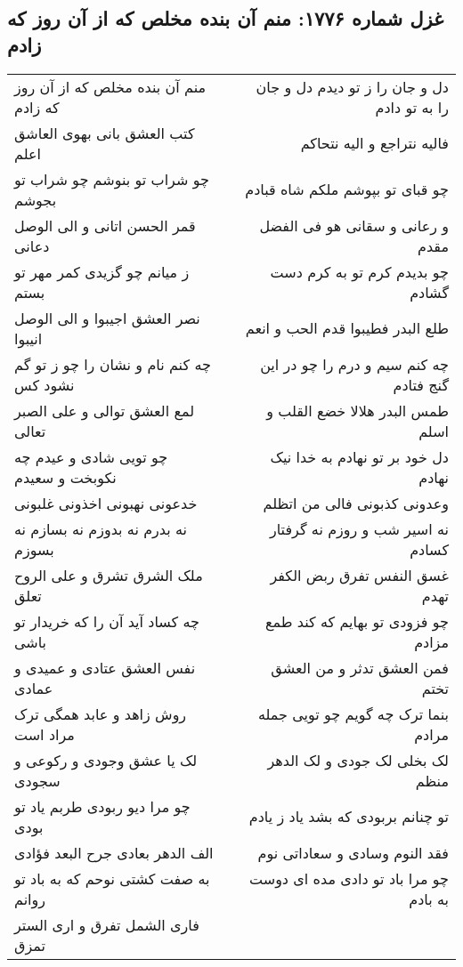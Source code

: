 \begin{center}
\section*{غزل شماره ۱۷۷۶: منم آن بنده مخلص که از آن روز که زادم}
\label{sec:1776}
\begin{longtable}{l p{0.5cm} r}
منم آن بنده مخلص که از آن روز که زادم
&&
دل و جان را ز تو دیدم دل و جان را به تو دادم
\\
کتب العشق بانی بهوی العاشق اعلم
&&
فالیه نتراجع و الیه نتحاکم
\\
چو شراب تو بنوشم چو شراب تو بجوشم
&&
چو قبای تو بپوشم ملکم شاه قبادم
\\
قمر الحسن اتانی و الی الوصل دعانی
&&
و رعانی و سقانی هو فی الفضل مقدم
\\
ز میانم چو گزیدی کمر مهر تو بستم
&&
چو بدیدم کرم تو به کرم دست گشادم
\\
نصر العشق اجیبوا و الی الوصل انیبوا
&&
طلع البدر فطیبوا قدم الحب و انعم
\\
چه کنم نام و نشان را چو ز تو گم نشود کس
&&
چه کنم سیم و درم را چو در این گنج فتادم
\\
لمع العشق توالی و علی الصبر تعالی
&&
طمس البدر هلالا خضع القلب و اسلم
\\
چو تویی شادی و عیدم چه نکوبخت و سعیدم
&&
دل خود بر تو نهادم به خدا نیک نهادم
\\
خدعونی نهبونی اخذونی غلبونی
&&
وعدونی کذبونی فالی من اتظلم
\\
نه بدرم نه بدوزم نه بسازم نه بسوزم
&&
نه اسیر شب و روزم نه گرفتار کسادم
\\
ملک الشرق تشرق و علی الروح تعلق
&&
غسق النفس تفرق ربض الکفر تهدم
\\
چه کساد آید آن را که خریدار تو باشی
&&
چو فزودی تو بهایم که کند طمع مزادم
\\
نفس العشق عتادی و عمیدی و عمادی
&&
فمن العشق تدثر و من العشق تختم
\\
روش زاهد و عابد همگی ترک مراد است
&&
بنما ترک چه گویم چو تویی جمله مرادم
\\
لک یا عشق وجودی و رکوعی و سجودی
&&
لک بخلی لک جودی و لک الدهر منظم
\\
چو مرا دیو ربودی طربم یاد تو بودی
&&
تو چنانم بربودی که بشد یاد ز یادم
\\
الف الدهر بعادی جرح البعد فؤادی
&&
فقد النوم وسادی و سعاداتی نوم
\\
به صفت کشتی نوحم که به باد تو روانم
&&
چو مرا باد تو دادی مده ای دوست به بادم
\\
فاری الشمل تفرق و اری الستر تمزق

\end{longtable}
\end{center}
